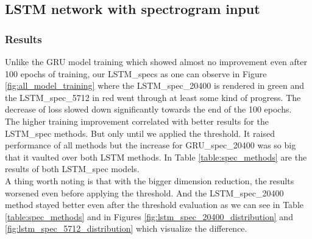 \subsection{LSTM network with spectrogram input}

\subsubsection{Results}
Unlike the GRU model training which showed almost no improvement even after 100 epochs of training, our LSTM\_specs as one can observe in Figure \ref{fig:all_model_training} where the LSTM\_spec\_20400 is rendered in green and the LSTM\_spec\_5712 in red went through at least some kind of progress. The decrease of loss slowed down significantly towards the end of the 100 epochs. \\
The higher training improvement correlated with better results for the LSTM\_spec methods. But only until we applied the threshold. It raised performance of all methods but the increase for GRU\_spec\_20400 was so big that it vaulted over both LSTM methods. In Table \ref{table:spec_methods} are the results of both LSTM\_spec models. \\
A thing worth noting is that with the bigger dimension reduction, the results worsened even before applying the threshold. And the LSTM\_spec\_20400 method stayed better even after the threshold evaluation as we can see in Table \ref{table:spec_methods} and in Figures \ref{fig:lstm_spec_20400_distribution} and \ref{fig:lstm_spec_5712_distribution} which visualize the difference.

